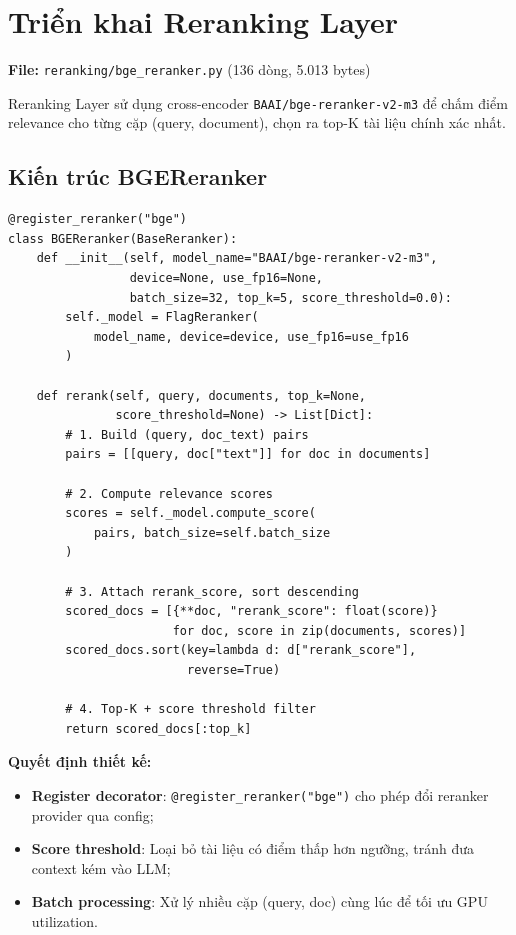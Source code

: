 \documentclass[../DoAn.tex]{subfiles}
\begin{document}
\section{Triển khai Reranking Layer}
\textbf{File:} \texttt{reranking/bge\_reranker.py} (136 dòng, 5.013 bytes)

Reranking Layer sử dụng cross-encoder \texttt{BAAI/bge-reranker-v2-m3} để chấm điểm relevance cho từng cặp (query, document), chọn ra top-K tài liệu chính xác nhất.

\subsection{Kiến trúc BGEReranker}
\begin{verbatim}
@register_reranker("bge")
class BGEReranker(BaseReranker):
    def __init__(self, model_name="BAAI/bge-reranker-v2-m3",
                 device=None, use_fp16=None,
                 batch_size=32, top_k=5, score_threshold=0.0):
        self._model = FlagReranker(
            model_name, device=device, use_fp16=use_fp16
        )

    def rerank(self, query, documents, top_k=None,
               score_threshold=None) -> List[Dict]:
        # 1. Build (query, doc_text) pairs
        pairs = [[query, doc["text"]] for doc in documents]

        # 2. Compute relevance scores
        scores = self._model.compute_score(
            pairs, batch_size=self.batch_size
        )

        # 3. Attach rerank_score, sort descending
        scored_docs = [{**doc, "rerank_score": float(score)}
                       for doc, score in zip(documents, scores)]
        scored_docs.sort(key=lambda d: d["rerank_score"],
                         reverse=True)

        # 4. Top-K + score threshold filter
        return scored_docs[:top_k]
\end{verbatim}

\textbf{Quyết định thiết kế:}
\begin{itemize}
    \item \textbf{Register decorator}: \texttt{@register\_reranker("bge")} cho phép đổi reranker provider qua config;
    \item \textbf{Score threshold}: Loại bỏ tài liệu có điểm thấp hơn ngưỡng, tránh đưa context kém vào LLM;
    \item \textbf{Batch processing}: Xử lý nhiều cặp (query, doc) cùng lúc để tối ưu GPU utilization.
\end{itemize}
\end{document}
